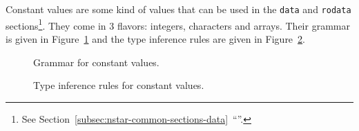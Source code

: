 Constant values are some kind of values that can be used in the \texttt{data} and \texttt{rodata} sections\footnote{See Section~\ref{subsec:nstar-common-sections-data}~``''.}.
They come in 3 flavors: integers, characters and arrays.
Their grammar is given in Figure~\ref{fig:nstar-common-constvalue-grammar} and the type inference rules are given in Figure~\ref{fig:nstar-common-constvalue-typerules}.

\begin{figure}[htb]
  \centering


  \caption{Grammar for constant values.}
  \label{fig:nstar-common-constvalue-grammar}
\end{figure}

\begin{figure}[htb]
  \centering


  \caption{Type inference rules for constant values.}
  \label{fig:nstar-common-constvalue-typerules}
\end{figure}

